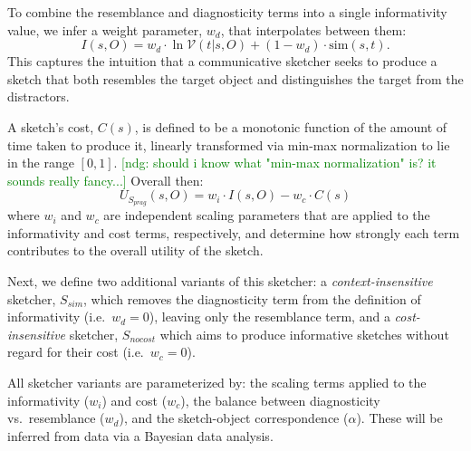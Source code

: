 \documentclass[9pt,twocolumn,twoside]{pnas-new}
\newcommand{\ndg}[1]{\textcolor{Green}{[ndg: #1]}}
\begin{document}
To combine the resemblance and diagnosticity terms into a single informativity value, we infer a weight parameter, $w_{d}$, that interpolates between them:
\begin{equation} \label{prag_interpolation}
I(s,O) = w_{d} \cdot \ln \mathcal{V}(t|s,O) + (1-w_{d}) \cdot \textrm{sim}(s,t). 
\end{equation} 
This captures the intuition that a communicative sketcher seeks to produce a sketch that both resembles the target object and distinguishes the target from the distractors.

A sketch's cost, $C(s)$, is defined to be a monotonic function of the amount of time taken to produce it, linearly transformed via min-max normalization to lie in the range $[0,1]$. \ndg{should i know what "min-max normalization" is? it sounds really fancy...}
Overall then:
\begin{equation} \label{sketcher_utility}
U_{S_{prag}}(s,O) = w_i \cdot I(s,O) - w_c \cdot  C(s)
\end{equation}
where $w_i$ and $w_c$ are independent scaling parameters that are applied to the informativity and cost terms, respectively, and determine how strongly each term contributes to the overall utility of the sketch. 

Next, we define two additional variants of this sketcher: a \textit{context-insensitive} sketcher, $S_{sim}$, which removes the diagnosticity term from the definition of informativity (i.e.~$w_{d}{=}0$), leaving only the resemblance term, and a \textit{cost-insensitive} sketcher, $S_{nocost}$ which aims to produce informative sketches without regard for their cost (i.e.~$w_c=0$).

All sketcher variants are parameterized by: the scaling terms applied to the informativity ($w_{i}$) and cost ($w_{c}$), the balance between diagnosticity vs.~resemblance ($w_{d}$), and the sketch-object correspondence ($\alpha$). These will be inferred from data via a Bayesian data analysis.
\end{document}
